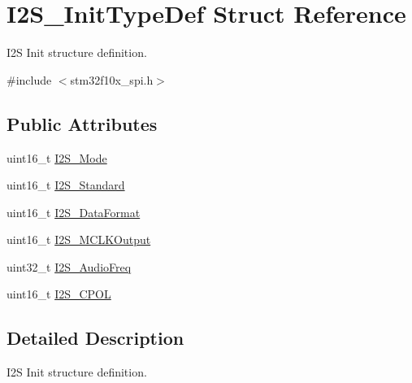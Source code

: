 \hypertarget{structI2S__InitTypeDef}{
\section{I2S\_\-InitTypeDef Struct Reference}
\label{structI2S__InitTypeDef}
}


I2S Init structure definition.  




{\ttfamily \#include $<$stm32f10x\_\-spi.h$>$}

\subsection*{Public Attributes}
\begin{DoxyCompactItemize}
\item 
uint16\_\-t \hyperlink{structI2S__InitTypeDef_aa57e5190eac245c0873a00849b1bd239}{I2S\_\-Mode}
\item 
uint16\_\-t \hyperlink{structI2S__InitTypeDef_ae987936e7cb9a962ee388c98f8c872b7}{I2S\_\-Standard}
\item 
uint16\_\-t \hyperlink{structI2S__InitTypeDef_ad5e59034081427fd638983c10f18e833}{I2S\_\-DataFormat}
\item 
uint16\_\-t \hyperlink{structI2S__InitTypeDef_ae7aaf79b7f392d79ac2f7b35a24e5d1a}{I2S\_\-MCLKOutput}
\item 
uint32\_\-t \hyperlink{structI2S__InitTypeDef_a87674c5fbccad53b7646565f35d1fc0a}{I2S\_\-AudioFreq}
\item 
uint16\_\-t \hyperlink{structI2S__InitTypeDef_aeb7741728520734ec2eab95d2143778c}{I2S\_\-CPOL}
\end{DoxyCompactItemize}


\subsection{Detailed Description}
I2S Init structure definition. 

